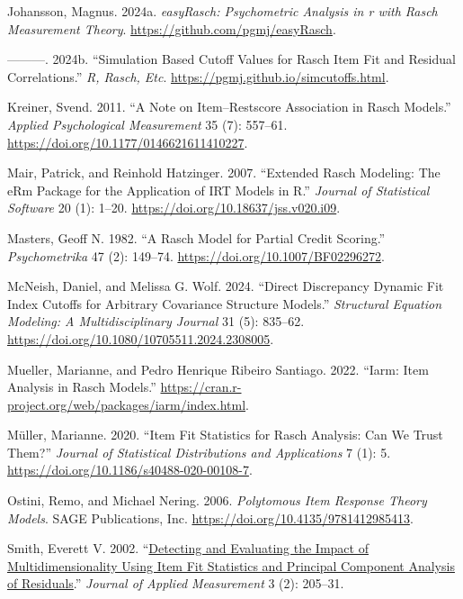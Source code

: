 \documentclass[
  letterpaper,
  DIV=11,
  numbers=noendperiod]{scrartcl}
\newlength{\cslhangindent}
\newenvironment{CSLReferences}[2] %
 {\begin{list}{}{%
  \setlength{\itemindent}{0pt}
  \setlength{\leftmargin}{0pt}
  \setlength{\parsep}{0pt}
  \ifodd #1
   \setlength{\leftmargin}{\cslhangindent}
   \setlength{\itemindent}{-1\cslhangindent}
  \fi
  \setlength{\itemsep}{#2\baselineskip}}}
 {\end{list}}
\begin{document}
\begin{CSLReferences}{1}{0}
Johansson, Magnus. 2024a. \emph{easyRasch: Psychometric Analysis in r
with Rasch Measurement Theory}. \url{https://github.com/pgmj/easyRasch}.

---------. 2024b. {``Simulation Based Cutoff Values for {Rasch} Item Fit
and Residual Correlations.''} \emph{R, Rasch, Etc}.
\url{https://pgmj.github.io/simcutoffs.html}.

Kreiner, Svend. 2011. {``A {Note} on {Item}--{Restscore} {Association}
in {Rasch} {Models}.''} \emph{Applied Psychological Measurement} 35 (7):
557--61. \url{https://doi.org/10.1177/0146621611410227}.

Mair, Patrick, and Reinhold Hatzinger. 2007. {``Extended {Rasch}
{Modeling}: {The} {eRm} {Package} for the {Application} of {IRT}
{Models} in {R}.''} \emph{Journal of Statistical Software} 20 (1):
1--20. \url{https://doi.org/10.18637/jss.v020.i09}.

Masters, Geoff N. 1982. {``A {Rasch} {Model} for {Partial} {Credit}
{Scoring}.''} \emph{Psychometrika} 47 (2): 149--74.
\url{https://doi.org/10.1007/BF02296272}.

McNeish, Daniel, and Melissa G. Wolf. 2024. {``Direct {Discrepancy}
{Dynamic} {Fit} {Index} {Cutoffs} for {Arbitrary} {Covariance}
{Structure} {Models}.''} \emph{Structural Equation Modeling: A
Multidisciplinary Journal} 31 (5): 835--62.
\url{https://doi.org/10.1080/10705511.2024.2308005}.

Mueller, Marianne, and Pedro Henrique Ribeiro Santiago. 2022. {``Iarm:
{Item} {Analysis} in {Rasch} {Models}.''}
\url{https://cran.r-project.org/web/packages/iarm/index.html}.

Müller, Marianne. 2020. {``Item Fit Statistics for {Rasch} Analysis: Can
We Trust Them?''} \emph{Journal of Statistical Distributions and
Applications} 7 (1): 5.
\url{https://doi.org/10.1186/s40488-020-00108-7}.

Ostini, Remo, and Michael Nering. 2006. \emph{Polytomous {Item}
{Response} {Theory} {Models}}. SAGE Publications, Inc.
\url{https://doi.org/10.4135/9781412985413}.

Smith, Everett V. 2002.
{``\href{https://www.ncbi.nlm.nih.gov/pubmed/12011501}{Detecting and
Evaluating the Impact of Multidimensionality Using Item Fit Statistics
and Principal Component Analysis of Residuals}.''} \emph{Journal of
Applied Measurement} 3 (2): 205--31.


\end{CSLReferences}
\end{document}
